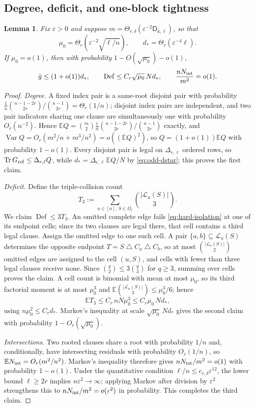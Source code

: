 \documentclass[11pt]{article}
\newtheorem{lemma}[lemma]{Lemma}
\theoremstyle{definition}
\theoremstyle{remark}
\newcommand{\E}{\mathbb E}
\newcommand{\1}{\mathbf 1}
\newcommand{\cL}{\mathcal L}
\newcommand{\sd}{\mathbin{\triangle}}
\newcommand{\eps}{\varepsilon}
\newcommand{\Dkl}{\mathsf D_{k,\ell}}
\DeclareMathOperator{\Tr}{Tr}
\DeclareMathOperator{\Var}{Var}
\DeclareMathOperator{\Def}{Def}
\numberwithin{equation}{section}
\begin{document}
\subsection{Degree, deficit, and one-block tightness}

\begin{lemma}\label{lem:odd-corrections}
Fix $\eps>0$ and suppose
$m=\Theta_{r,\delta}(\eps^{-2}\Dkl)$, so that
\[
 \mu_0=\Theta_r(\eps^{-2}\sqrt{\ell/n}),
 \qquad
 d_*=\Theta_r(\eps^{-4}\ell).
\]
If $\mu_0=o(1)$, then with probability $1-O(\sqrt{\mu_0})-o(1)$,
\begin{equation}\label{eq:odd-corrections}
 \bar g\le(1+o(1))d_*,
 \qquad
 \Def\le C_r\sqrt{\mu_0}\,Nd_*,
 \qquad
 \frac{nN_{\rm int}}{m^2}=o(1).
\end{equation}
\end{lemma}
\begin{proof}
\emph{Degree.}  A fixed index pair is a same-root disjoint pair with
probability
$\frac1n\binom{n-1-2r}{2r}/\binom{n-1}{2r}=\Theta_r(1/n)$; disjoint
index pairs are independent, and two pair indicators sharing one clause
are simultaneously one with probability $O_r(n^{-2})$.  Hence
$\E Q=\binom m2\frac1n\binom{n-1-2r}{2r}/\binom{n-1}{2r}$ exactly, and
$\Var Q=O_r(m^2/n+m^3/n^2)=o((\E Q)^2)$, so
$Q=(1+o(1))\E Q$ with probability $1-o(1)$.  Every disjoint pair is
legal on $\Delta_{r,\ell}$ ordered rows, so
$\Tr G_{\rm ref}\le\Delta_{r,\ell}Q$, while
$d_*=\Delta_{r,\ell}\,\E Q/N$ by \cref{eq:odd-dstar}; this proves the
first claim.

\emph{Deficit.}  Define the triple-collision count
\begin{equation}\label{eq:triple-collision}
 T_3:=\sum_{u\in[n],\,S\in\Omega_\ell}\binom{|\cL_u(S)|}{3}.
\end{equation}
We claim $\Def\le3T_3$.  An omitted complete edge fails
\cref{eq:hard-isolation} at one of its endpoint cells; since its two
clauses are legal there, that cell contains a third legal clause.
Assign the omitted edge to one such cell.  A pair
$\{a,b\}\subseteq\cL_u(S)$ determines the opposite endpoint
$T=S\sd C_a\sd C_b$, so at most $\binom{|\cL_u(S)|}2$ omitted edges are
assigned to the cell $(u,S)$, and cells with fewer than three legal
clauses receive none.  Since $\binom q2\le3\binom q3$ for $q\ge3$,
summing over cells proves the claim.  A cell count is binomial with
mean at most $\mu_0$, so its third factorial moment is at most
$\mu_0^3$ and $\E\binom{|\cL_u(S)|}3\le\mu_0^3/6$; hence
\[
 \E T_3\le C_r\,nN\mu_0^3\le C_r\mu_0\,Nd_* ,
\]
using $n\mu_0^2\le C_rd_*$.  Markov's inequality at scale
$\sqrt{\mu_0}\,Nd_*$ gives the second claim with probability
$1-O_r(\sqrt{\mu_0})$.

\emph{Intersections.}  Two rooted clauses share a root with probability
$1/n$ and, conditionally, have intersecting residuals with probability
$O_r(1/n)$, so
$\E N_{\rm int}=O_r(m^2/n^2)$.  Markov's inequality therefore gives
$nN_{\rm int}/m^2=o(1)$ with probability $1-o(1)$.  Under the
quantitative condition $\ell/n\le c_{r,\delta}\eps^{12}$, the lower
bound $\ell\ge2r$ implies $n\eps^2\to\infty$; applying Markov after
division by $\eps^2$ strengthens this to
$nN_{\rm int}/m^2=o(\eps^2)$ in probability.  This completes the third
claim.
\end{proof}
\end{document}
